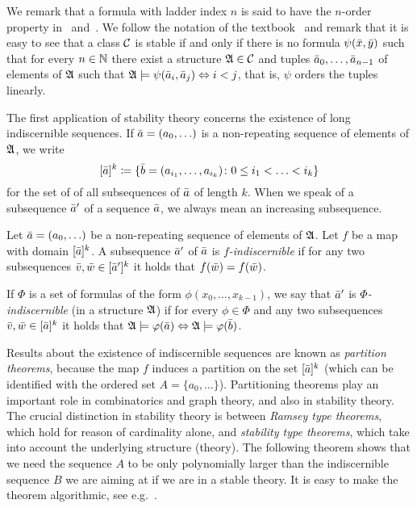 We remark that a formula with ladder index $n$ is said to have the
$n$-order property in~\cite{adler2014interpreting} and~\cite{ensley1996finite}.
We follow the notation of the textbook~\cite{hodges1993model} and remark
that it is easy to see that a class $\mathcal{C}$ is stable if and only if there is no 
formula $\psi(\bar{x},\bar{y})$ such that for every $n\in \mathbb{N}$
there exist a structure $\mathfrak{A}\in \mathcal{C}$ and tuples $\bar{a}_0,\ldots, \bar{a}_{n-1}$
of elements of $\mathfrak{A}$ such that $\mathfrak{A}\models\psi(\bar{a}_i,\bar{a}_j)\Leftrightarrow i<j$,
that is, $\psi$ orders the tuples linearly. 

The first application of stability theory concerns the existence of long
indiscernible sequences. If $\bar{a}=(a_0,\ldots)$ is a non-repeating sequence of elements of $\mathfrak{A}$, we write \[[\bar{a}]^k\coloneqq \{\bar{b}=(a_{i_1},\ldots, a_{i_k}) \colon 0\leq i_1<\ldots <i_k\}\] for the set of of all subsequences
of $\bar{a}$ of length $k$. When we speak of a subsequence $\bar{a}'$
of a sequence $\bar{a}$, we always mean an increasing subsequence. 

\begin{definition}
Let $\bar{a}=(a_0,\ldots)$ be a non-repeating sequence of elements of $\mathfrak{A}$.
Let $f$ be a map with domain $[\bar{a}]^k$. A subsequence $\bar{a}'$ 
of $\bar{a}$ is \emph{$f$-indiscernible} if for any two 
subsequences $\bar{v},\bar{w}\in [\bar{a}']^k$ 
it holds that $f(\bar{w})=f(\bar{w})$.

If $\Phi$ is a set of formulas of the form $\phi(x_0,\ldots, x_{k-1})$, 
we say that $\bar{a}'$ 
is \emph{$\Phi$-indiscernible} (in a structure $\mathfrak{A}$)
if for every $\phi\in \Phi$ and any two 
subsequences $\bar{v},\bar{w}\in [\bar{a}]^k$ it
holds that $\mathfrak{A}\models\varphi(\bar{a})\Leftrightarrow\mathfrak{A}\models\varphi(\bar{b})$. 
\end{definition}


Results about the existence of indiscernible sequences are known as 
\emph{partition theorems}, because the map $f$ induces a partition
on the set $[\bar{a}]^k$ (which can be identified with the ordered 
set $A=\{a_0,\ldots\}$). Partitioning theorems play an important role in 
combinatorics and graph theory, and also in stability theory. The 
crucial distinction in stability theory is between \emph{Ramsey type 
theorems}, which hold
for reason of cardinality alone, and \emph{stability type theorems},
which take into account the underlying structure (theory). The following
theorem shows that we need the sequence $A$ to be only polynomially larger
than the indiscernible sequence $B$ we are aiming at if we are in a stable theory. 
It is easy to make the theorem algorithmic, see 
e.g.~\cite{siebertz2016polynomial}. 

